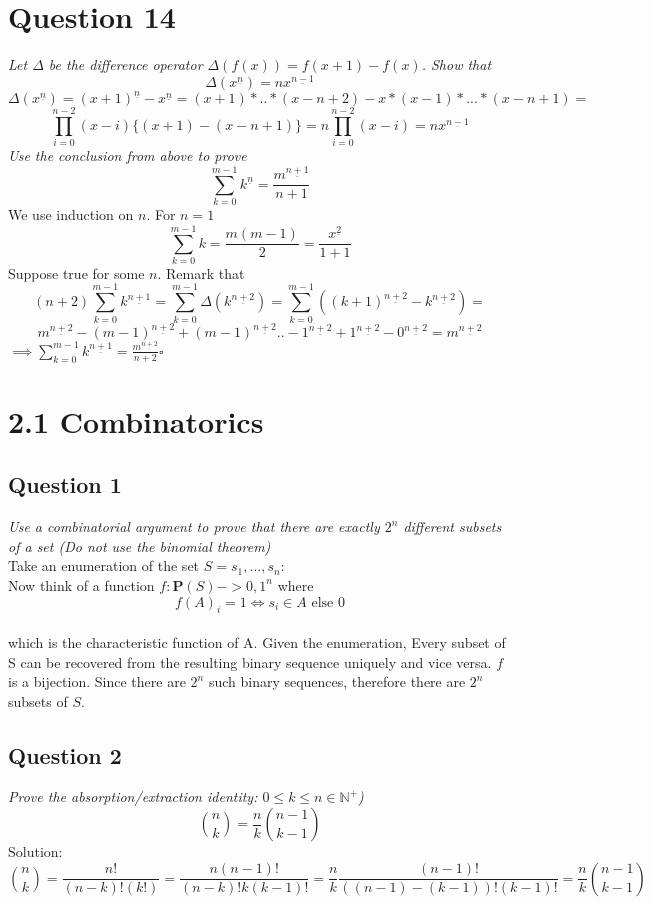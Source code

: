 \documentclass{article}
\newcommand{\fallingfactorial}[1]{%
  ^{\underline{#1}}%
}
\begin{document}
\section{Question 14}
\emph{Let $\Delta$ be the difference operator $\Delta(f(x)) = f(x+1) - f(x)$. Show that}
$$
\Delta(x\fallingfactorial{n}) = nx\fallingfactorial{n-1}
$$
\medskip
$$
\Delta(x\fallingfactorial{n}) = (x+1)\fallingfactorial{n} - x\fallingfactorial{n} = (x+1) * .. * (x-n+2) - x*(x-1) * ... *(x-n+1) =
$$
$$
\prod_{i=0}^{n-2}(x-i) \{(x+1) - (x-n+1)\} = n\prod_{i=0}^{n-2}(x-i) = n x\fallingfactorial{n-1}
$$
\medskip
\emph{Use the conclusion from above to prove}
$$
\sum_{k=0}^{m-1}k\fallingfactorial{n} = \frac{m\fallingfactorial{n+1}}{n+1}
$$
\medskip
We use induction on $n$.
For $n=1$
$$
\sum_{k=0}^{m-1} k = \frac{m(m-1)}{2} = \frac{x\fallingfactorial{2}}{1+1}
$$
Suppose true for some $n$. Remark that
$$
(n+2) \sum_{k=0}^{m-1} k \fallingfactorial{n+1} = \sum_{k=0}^{m-1} \Delta(k\fallingfactorial{n+2}) = \sum_{k=0}^{m-1} ((k+1)\fallingfactorial{n+2} - k\fallingfactorial{n+2}) = 
$$
$$
m\fallingfactorial{n+2} - (m-1)\fallingfactorial{n+2} + (m-1)\fallingfactorial{n+2} .. - 1\fallingfactorial{n+2} + 1\fallingfactorial{n+2} - 0\fallingfactorial{n+2} = m\fallingfactorial{n+2}
$$
$\implies \sum_{k=0}^{m-1} k \fallingfactorial{n+1} = \frac{m\fallingfactorial{n+2}}{n+2} \square$
\newpage
\section{2.1 Combinatorics}
\subsection{Question 1}
\smallskip
\emph{Use a combinatorial argument to prove that there are exactly $2^n$ different subsets of a set (Do not use the binomial theorem)}
\bigskip
\\
Take an enumeration of the set $S = {s_1, ..., s_n }$: 
\\
Now think of a function $f:\mathbf{P}(S) -> {0, 1}^n$ where
$$
f(A)_i = 1 \iff s_i \in A \text{  else  } 0
$$
\smallskip
\\
which is the characteristic function of A. Given the enumeration, Every subset of S can be recovered from the resulting binary sequence uniquely and vice versa. $f$ is a bijection. Since there are $2^n$ such binary sequences, therefore there are $2^n$ subsets of $S$.
\bigskip
\\
\subsection{Question 2}
\smallskip
\emph{Prove the absorption/extraction identity: $0\leq k \leq n \in \mathbb{N}^+$)}
\bigskip
\\
$$
{n\choose k} = \frac{n}{k} {n-1\choose k-1}
$$
Solution:
$$
{n\choose k} = \frac{n!}{(n-k)! (k!)} = \frac{n(n-1)!}{(n-k)! k(k-1)!} = \frac{n}{k}\frac{(n-1)!}{((n-1)-(k-1))! (k-1)!} = \frac{n}{k} {n-1\choose k-1}
$$
\end{document}
